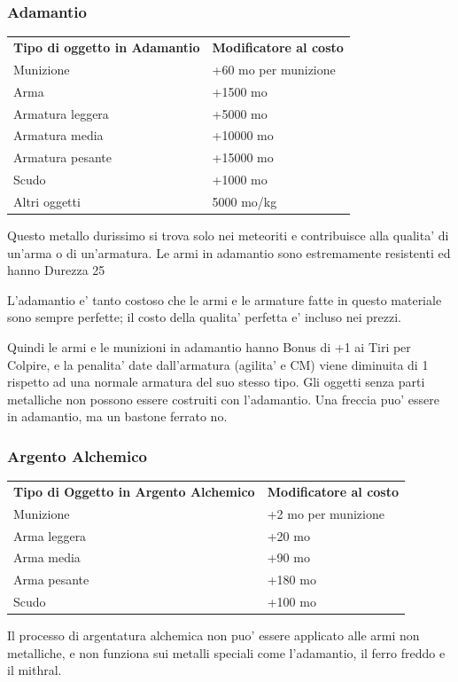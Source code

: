 \documentclass[a4paper,11pt,twoside,openany]{book}
\begin{document}
{		\subsubsection{Adamantio}
		
		\label{adamantio}
		
		\begin{tabular}{ll}
			\toprule 
			\textbf{Tipo di oggetto in Adamantio} & \textbf{Modificatore al costo}\tabularnewline
			Munizione & +60 mo per munizione\tabularnewline
			Arma & +1500 mo\tabularnewline
			Armatura leggera & +5000 mo\tabularnewline
			Armatura media & +10000 mo\tabularnewline
			Armatura pesante & +15000 mo\tabularnewline
			Scudo & +1000 mo\tabularnewline
			Altri oggetti & 5000 mo/kg\tabularnewline
		\end{tabular}
		
		Questo metallo durissimo si trova solo nei meteoriti e contribuisce alla qualita' di un'arma o di un'armatura. Le armi in adamantio sono estremamente resistenti ed hanno Durezza 25
		
		L'adamantio e' tanto costoso che le armi e le armature fatte in questo materiale sono sempre perfette; il costo della qualita' perfetta e' incluso nei prezzi.
		
		Quindi le armi e le munizioni in adamantio hanno Bonus di +1 ai Tiri per Colpire, e la penalita' date dall'armatura (agilita' e CM) viene diminuita di 1 rispetto ad una normale armatura del suo stesso tipo. Gli oggetti senza parti metalliche non possono essere costruiti con l'adamantio. Una freccia puo' essere in adamantio, ma un bastone ferrato
		no.
		
		\subsubsection{Argento Alchemico}
		
		\label{argento-alchemico}
		
		\begin{tabular}{ll}
			\toprule
			\textbf{Tipo di Oggetto in Argento Alchemico} & \textbf{Modificatore al costo}\tabularnewline
			Munizione & +2 mo per munizione\tabularnewline
			Arma leggera & +20 mo\tabularnewline
			Arma media & +90 mo\tabularnewline
			Arma pesante & +180 mo\tabularnewline
			Scudo & +100 mo\tabularnewline
		\end{tabular}
		
		Il processo di argentatura alchemica non puo' essere applicato alle armi non metalliche, e non funziona sui metalli speciali come l'adamantio, il ferro freddo e il mithral.
		
}
\end{document}
